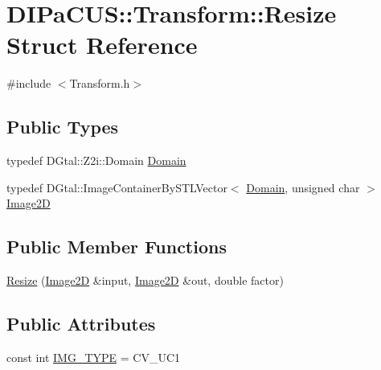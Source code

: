 \hypertarget{structDIPaCUS_1_1Transform_1_1Resize}{}\section{D\+I\+Pa\+C\+US\+:\+:Transform\+:\+:Resize Struct Reference}
\label{structDIPaCUS_1_1Transform_1_1Resize}


{\ttfamily \#include $<$Transform.\+h$>$}

\subsection*{Public Types}
\begin{DoxyCompactItemize}
\item 
typedef D\+Gtal\+::\+Z2i\+::\+Domain \mbox{\hyperlink{structDIPaCUS_1_1Transform_1_1Resize_ae3f578e82510c6343d4fd876853382ed}{Domain}}
\item 
typedef D\+Gtal\+::\+Image\+Container\+By\+S\+T\+L\+Vector$<$ \mbox{\hyperlink{structDIPaCUS_1_1Transform_1_1Resize_ae3f578e82510c6343d4fd876853382ed}{Domain}}, unsigned char $>$ \mbox{\hyperlink{structDIPaCUS_1_1Transform_1_1Resize_a0e4548850b3aed5dd86283f0c4f38fee}{Image2D}}
\end{DoxyCompactItemize}
\subsection*{Public Member Functions}
\begin{DoxyCompactItemize}
\item 
\mbox{\hyperlink{structDIPaCUS_1_1Transform_1_1Resize_a66b411e6c07d5d6cd520843eb025530d}{Resize}} (\mbox{\hyperlink{structDIPaCUS_1_1Transform_1_1Resize_a0e4548850b3aed5dd86283f0c4f38fee}{Image2D}} \&input, \mbox{\hyperlink{structDIPaCUS_1_1Transform_1_1Resize_a0e4548850b3aed5dd86283f0c4f38fee}{Image2D}} \&out, double factor)
\end{DoxyCompactItemize}
\subsection*{Public Attributes}
\begin{DoxyCompactItemize}
\item 
const int \mbox{\hyperlink{structDIPaCUS_1_1Transform_1_1Resize_a94f6df88ddb94760235b92da8580b1d8}{I\+M\+G\+\_\+\+T\+Y\+PE}} = C\+V\+\_\+U\+C1
\end{DoxyCompactItemize}


